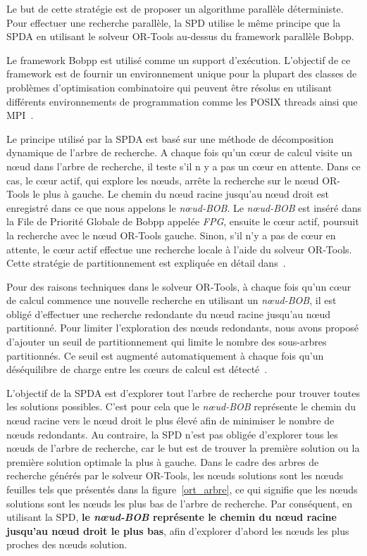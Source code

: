 \documentclass[parallelisme]{compas2014}
\begin{document}
Le but de cette stratégie est de proposer un algorithme parallèle déterministe. 
Pour effectuer une recherche parallèle, la SPD utilise le même principe que la SPDA en utilisant le solveur OR-Tools au-dessus du framework parallèle Bobpp.

Le framework Bobpp est utilisé comme un support d'exécution. L'objectif de ce framework est de fournir un environnement unique pour la plupart des classes de problèmes d'optimisation combinatoire qui peuvent être résolus en utilisant différents environnements de programmation comme les POSIX threads ainsi que MPI~\cite{GaLe07}.

Le principe utilisé par la SPDA est basé sur une méthode de décomposition dynamique de l'arbre de 
recherche. 
A chaque fois qu'un cœur de calcul visite un nœud dans l'arbre de recherche, il teste s'il n y a pas un cœur en attente. Dans ce cas, le cœur actif, qui explore les nœuds, arrête la recherche sur le nœud OR-Tools le plus à gauche. Le chemin du nœud racine jusqu'au nœud droit est enregistré dans ce que nous appelons le \textit{nœud-BOB}. Le \textit{nœud-BOB} est inséré dans la File de Priorité Globale de Bobpp appelée \textit{FPG}, ensuite le cœur actif, poursuit la recherche avec le nœud OR-Tools gauche. Sinon, s'il n'y a pas de cœur en attente, le cœur actif effectue une recherche locale à l'aide du solveur OR-Tools. Cette stratégie de partitionnement est expliquée en détail dans~\cite{TMBLPCO13}.

Pour des raisons techniques dans le solveur OR-Tools, à chaque fois qu'un cœur de calcul commence une nouvelle recherche en utilisant un \textit{nœud-BOB}, il est obligé d'effectuer une recherche redondante du nœud racine jusqu'au nœud partitionné. Pour limiter l'exploration des nœuds redondants, nous avons proposé d'ajouter un seuil de partitionnement qui limite le nombre des sous-arbres partitionnés. Ce seuil est augmenté automatiquement à chaque fois qu'un déséquilibre de charge entre les cœurs de calcul est détecté~\cite{TMBLPCO13}.

L'objectif de la SPDA est d'explorer tout l'arbre de recherche pour trouver toutes les solutions possibles. C'est pour cela que le \textit{nœud-BOB} représente le chemin du nœud racine vers le nœud droit le plus élevé afin de minimiser le nombre de nœuds redondants.
Au contraire, la SPD n'est pas obligée d'explorer tous les nœuds de l'arbre de recherche, car le but est de trouver la première solution ou la première solution optimale la plus à gauche.
Dans le cadre des arbres de recherche générés par le solveur OR-Tools, les nœuds solutions sont les nœuds feuilles tels que présentés dans la figure~\ref{ort_arbre}, ce qui signifie que les nœuds solutions sont les nœuds les plus bas de l'arbre de recherche.
Par conséquent, en utilisant la SPD, \textbf{le \textit {nœud-BOB} représente le chemin du nœud racine jusqu'au nœud droit le plus bas}, afin d'explorer d'abord les nœuds les plus proches des nœuds solution.
\end{document}
